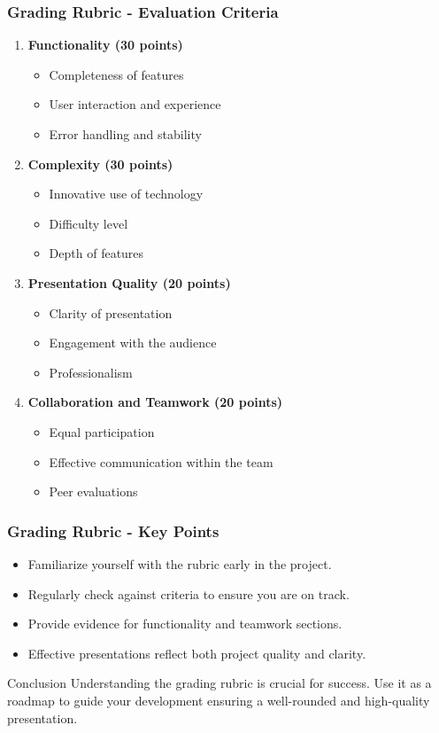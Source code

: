 \documentclass{beamer}
\begin{document}
\begin{frame}[fragile]
    \frametitle{Grading Rubric - Evaluation Criteria}
    \begin{enumerate}
        \item \textbf{Functionality (30 points)}
            \begin{itemize}
                \item Completeness of features
                \item User interaction and experience
                \item Error handling and stability
            \end{itemize}
        \item \textbf{Complexity (30 points)}
            \begin{itemize}
                \item Innovative use of technology
                \item Difficulty level
                \item Depth of features
            \end{itemize}
        \item \textbf{Presentation Quality (20 points)}
            \begin{itemize}
                \item Clarity of presentation
                \item Engagement with the audience
                \item Professionalism
            \end{itemize}
        \item \textbf{Collaboration and Teamwork (20 points)}
            \begin{itemize}
                \item Equal participation
                \item Effective communication within the team
                \item Peer evaluations
            \end{itemize}
    \end{enumerate}
\end{frame}

\begin{frame}[fragile]
    \frametitle{Grading Rubric - Key Points}
    \begin{itemize}
        \item Familiarize yourself with the rubric early in the project.
        \item Regularly check against criteria to ensure you are on track.
        \item Provide evidence for functionality and teamwork sections.
        \item Effective presentations reflect both project quality and clarity.
    \end{itemize}
    
    \begin{block}{Conclusion}
        Understanding the grading rubric is crucial for success. Use it as a roadmap to guide your development ensuring a well-rounded and high-quality presentation.
    \end{block}
\end{frame}
\end{document}
